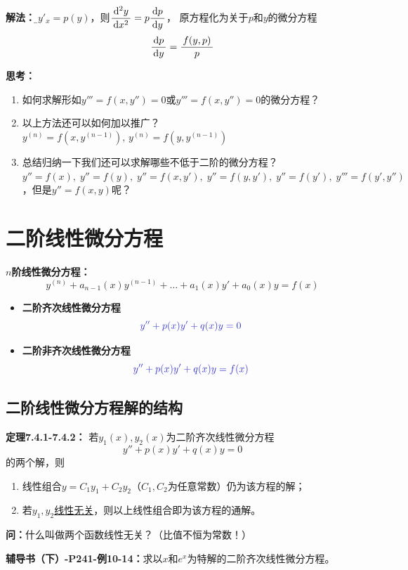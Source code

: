 {\bf 解法：}{\b 令$y'_x=p(y)$，则$\displaystyle\frac{\,{\mathrm{d}^2y}\,}{\,{\mathrm{d} x^2}\,}=p\displaystyle\frac{\,{\mathrm{d} p}\,}{\,{\mathrm{d} y}\,}$，
原方程化为关于$p$和$y$的微分方程$$\displaystyle\frac{\,{\mathrm{d} p}\,}{\,{\mathrm{d} y}\,}=\displaystyle\frac{\,{f(y,p)}\,}{\,{p}\,}$$
}

{\bf 思考：}
\begin{enumerate}[(1)]
  \setlength{\itemindent}{1cm}
  \item 如何求解形如$y'''=f(x,y'')=0$或$y'''=f(x,y'')=0$的微分方程？
  \item 以上方法还可以如何加以推广？\hfill$y^{(n)}=f(x,y^{(n-1)}),
  \,y^{(n)}=f(y,y^{(n-1)})$
  \item 总结归纳一下我们还可以求解哪些不低于二阶的微分方程？\\
  $y''=f(x),\;y''=f(y),\;y''=f(x,y'),\;y''=f(y,y'),
  \;y''=f(y'),\;y'''=f(y',y'')$，但是$y''=f(x,y)$呢？
\end{enumerate}

\section{二阶线性微分方程}

{\bf $n$阶线性微分方程：}
$$y^{(n)}+a_{n-1}(x)y^{(n-1)}+\ldots+a_1(x)y'+a_0(x)y=f(x)$$

\begin{itemize}
  \setlength{\itemindent}{1cm}
  \item {\bf 二阶齐次线性微分方程}
  $${\b y''+p(x)y'+q(x)y=0}$$
  \item {\bf 二阶非齐次线性微分方程}
  $${\b y''+p(x)y'+q(x)y=f(x)}$$
\end{itemize}

\subsection{二阶线性微分方程解的结构}

{\bf 定理7.4.1-7.4.2：}
若$y_1(x),y_2(x)$为二阶齐次线性微分方程
$$y''+p(x)y'+q(x)y=0$$
的两个解，则 
\begin{enumerate}[(1)]
  \setlength{\itemindent}{1cm}
  \item 线性组合${y=C_1y_1+C_2y_2}$（$C_1,C_2$为任意常数）仍为该方程的解； 
  \item 若$y_1,y_2${\underline{线性无关}}，则以上线性组合即为该方程的通解。
\end{enumerate}

{\bf 问：}什么叫做两个函数线性无关？（比值不恒为常数！）

{\bf 辅导书（下）-P241-例10-14：}求以$x$和$e^x$为特解的二阶齐次线性微分方程。

